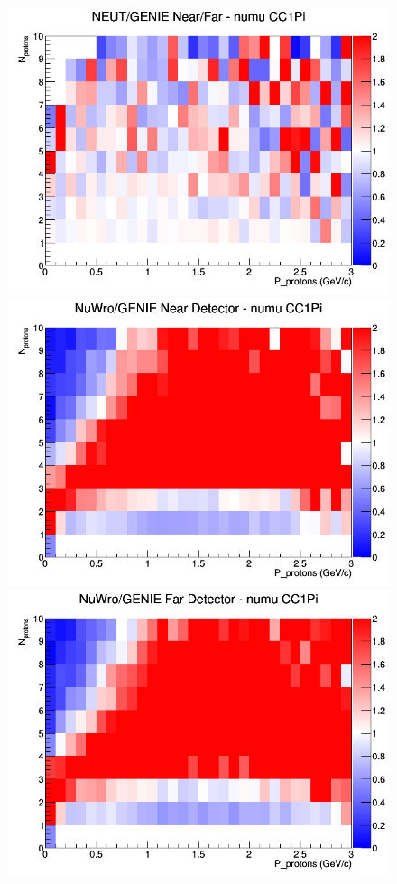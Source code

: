 \documentclass[12pt]{article}
\begin{document}
\begin{figure}[h]
\endminipage
{}
\includegraphics[width=\linewidth]{N_P/nominal/protons/ratios/CC1Pi_NEUT_GENIE_numu_NF_N_P.png}
\endminipage
\newline
{}
\includegraphics[width=\linewidth]{N_P/nominal/protons/ratios/CC1Pi_NuWro_GENIE_numu_near_N_P.png}
\endminipage
{}
\includegraphics[width=\linewidth]{N_P/nominal/protons/ratios/CC1Pi_NuWro_GENIE_numu_far_N_P.png}

\end{figure}
\end{document}

